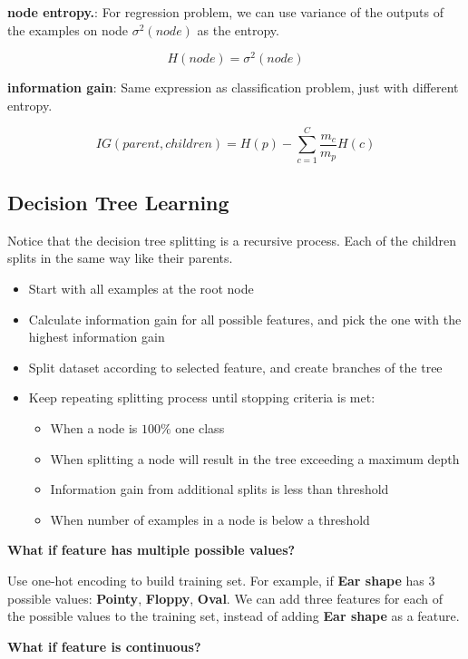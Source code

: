 \documentclass{article}
\begin{document}
\textbf{node entropy.}: For regression problem, we can use variance of the outputs of the examples on node \(\sigma^{2}(node)\) as the entropy.

\[{H}(node) = \sigma^{2}(node)\]

\textbf{information gain}: Same expression as classification problem, just with different entropy.

\[{IG}(parent, children) = H(p) - \sum _{c=1}^{C}\frac{m_{c}}{m_{p}}{H}(c)\]

\subsection{Decision Tree Learning}

Notice that the decision tree splitting is a recursive process. Each of the children splits in the same way like their parents.

\begin{itemize}
    \item Start with all examples at the root node
    \item Calculate information gain for all possible features, and pick the one with
the highest information gain
    \item Split dataset according to selected feature, and create branches of the tree
    \item Keep repeating splitting process until stopping criteria is met:
    \begin{itemize}
        \item When a node is \(100\%\) one class
        \item When splitting a node will result in the tree exceeding a maximum
depth
        \item Information gain from additional splits is less than threshold
        \item When number of examples in a node is below a threshold
    \end{itemize}
\end{itemize}

\textbf{What if feature has multiple possible values?}

Use one-hot encoding to build training set. For example, if \textbf{Ear shape} has 3 possible values: \textbf{Pointy}, \textbf{Floppy}, \textbf{Oval}. We can add three features for each of the possible values to the training set, instead of adding \textbf{Ear shape} as a feature.

\textbf{What if feature is continuous?}
\end{document}
